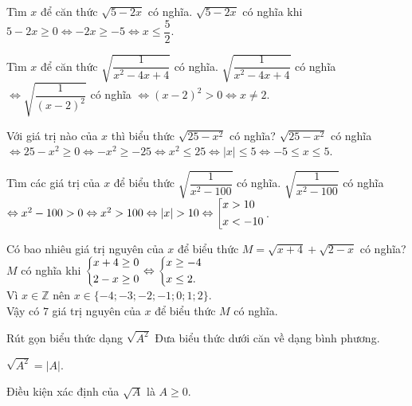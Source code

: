 \begin{vd}
	Tìm $x$ để căn thức $\sqrt{5-2x}$ có nghĩa.
	\loigiai
	{
		$\sqrt{5-2x}$ có nghĩa khi $5-2x \ge 0 \Leftrightarrow -2x \ge -5 \Leftrightarrow x \le \dfrac{5}{2}$.
	}
\end{vd}

\begin{vd}
	Tìm $x$ để căn thức $\sqrt{\dfrac{1}{x^2-4x+4}}$ có nghĩa.
    \loigiai
    {
		$\sqrt{\dfrac{1}{x^2-4x+4}}$ có nghĩa $\Leftrightarrow \sqrt{\dfrac{1}{(x-2)^2}}$ có nghĩa $\Leftrightarrow (x-2)^2 > 0 \Leftrightarrow x \ne 2$.
    }
\end{vd}

\begin{vd}
	Với giá trị nào của $x$ thì biểu thức $\sqrt{25-x^2}$ có nghĩa?
	\loigiai
	{
		$\sqrt{25-x^2}$ có nghĩa $\Leftrightarrow 25-x^2 \ge 0 \Leftrightarrow -x^2 \ge -25 \Leftrightarrow x^2 \le 25 \Leftrightarrow |x| \le 5 \Leftrightarrow -5 \le x \le 5$.
    }
\end{vd}

\begin{vd}
	Tìm các giá trị của $x$ để biểu thức $\sqrt{\dfrac{1}{x^2-100}}$ có nghĩa.
    \loigiai
    {
		$\sqrt{\dfrac{1}{x^2-100}}$ có nghĩa $\Leftrightarrow x^2-100 > 0 \Leftrightarrow x^2 > 100 \Leftrightarrow |x| >10 \Leftrightarrow \left[\begin{aligned}&x>10\\&x<-10\end{aligned}\right.$.
    }
\end{vd}

\begin{vd}
	Có bao nhiêu giá trị nguyên của $x$ để biểu thức $M=\sqrt{x+4}+\sqrt{2-x}$ có nghĩa?
    \loigiai
    {
		$M$ có nghĩa khi $\left\{\begin{aligned}&x+4 \ge 0\\&2-x \ge 0\end{aligned}\right. \Leftrightarrow \left\{\begin{aligned}&x \ge -4\\&x \le 2.\end{aligned}\right.$\\
		Vì $x \in \mathbb{Z}$ nên $x \in \{-4;-3;-2;-1;0;1;2\}$.\\
		Vậy có $7$ giá trị nguyên của $x$ để biểu thức $M$ có nghĩa.
    }
\end{vd}



\begin{dang}{Rút gọn biểu thức dạng $\sqrt{A^2}$}
    Đưa biểu thức dưới căn về dạng bình phương.
   \begin{center}
   	 	$\sqrt{A^2}=\left| A\right| $.
   \end{center}
    \begin{note}
        Điều kiện xác định của $\sqrt{A}$ là $A\geqslant 0$.
    \end{note}
\end{dang}

